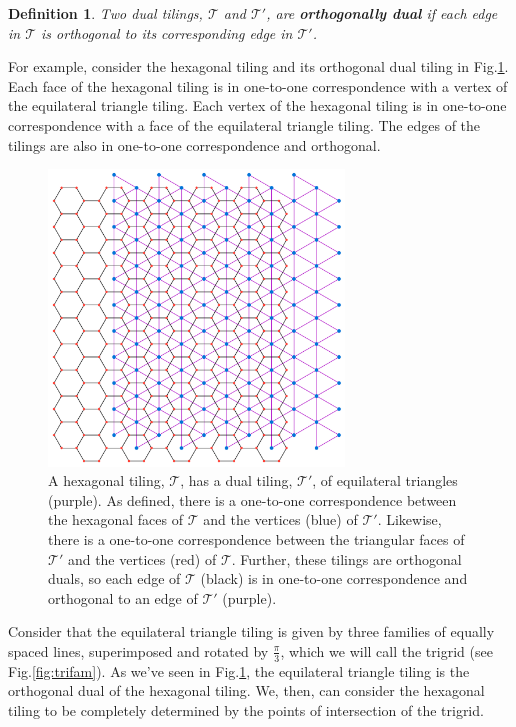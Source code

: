 \documentclass[
  oneside,
  11pt, a4paper,
  footinclude=true,
  headinclude=true,
  cleardoublepage=empty
]{scrbook}
\newtheorem{mydef}{Definition}
\begin{document}
\begin{mydef}
Two dual tilings, $\mathcal{T}$ and $\mathcal{T}'$, are \textbf{orthogonally dual} if each edge in $\mathcal{T}$ is orthogonal to its corresponding edge in $\mathcal{T}'$.
\end{mydef}

For example, consider the hexagonal tiling and its orthogonal dual tiling in Fig.\ref{fig:Hexagons}. Each face of the hexagonal tiling is in one-to-one correspondence with a vertex of the equilateral triangle tiling. Each vertex of the hexagonal tiling is in one-to-one correspondence with a face of the equilateral triangle tiling. The edges of the tilings are also in one-to-one correspondence and orthogonal. 

\begin{figure}[H]
\centering
\includegraphics[width=0.7\textwidth]{HexagonDuals}
\caption{A hexagonal tiling, $\mathcal{T}$, has a dual tiling, $\mathcal{T}'$, of equilateral triangles (purple). As defined, there is a one-to-one correspondence between the hexagonal faces of $\mathcal{T}$ and the vertices (blue) of $\mathcal{T}'$. Likewise, there is a one-to-one correspondence between the triangular faces of $\mathcal{T}'$ and the vertices (red) of $\mathcal{T}$. Further, these tilings are orthogonal duals, so each edge of $\mathcal{T}$ (black) is in one-to-one correspondence and orthogonal to an edge of $\mathcal{T}'$ (purple).}
\label{fig:Hexagons}
\end{figure}

Consider that the equilateral triangle tiling is given by three families of equally spaced lines, superimposed and rotated by $\frac{\pi}{3}$, which we will call the trigrid (see Fig.\ref{fig:trifam}). As we've seen in Fig.\ref{fig:Hexagons}, the equilateral triangle tiling is the orthogonal dual of the hexagonal tiling. We, then, can consider the hexagonal tiling to be completely determined by the points of intersection of the trigrid. 
\end{document}
